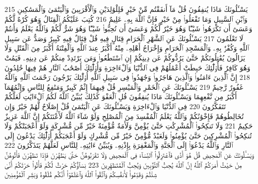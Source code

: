 {\tiny\colorbox{cl_aya}{215}} يَسْـَٔلُونَكَ مَاذَا يُنفِقُونَ قُلْ مَآ أَنفَقْتُم مِّنْ خَيْرٍ فَلِلْوَٰلِدَيْنِ وَٱلْأَقْرَبِينَ وَٱلْيَتَٰمَىٰ وَٱلْمَسَٰكِينِ وَٱبْنِ ٱلسَّبِيلِ وَمَا تَفْعَلُوا۟ مِنْ خَيْرٍ فَإِنَّ ٱللَّهَ بِهِۦ عَلِيمٌ
{\tiny\colorbox{cl_aya}{216}} كُتِبَ عَلَيْكُمُ ٱلْقِتَالُ وَهُوَ كُرْهٌ لَّكُمْ وَعَسَىٰٓ أَن تَكْرَهُوا۟ شَيْـًٔا وَهُوَ خَيْرٌ لَّكُمْ وَعَسَىٰٓ أَن تُحِبُّوا۟ شَيْـًٔا وَهُوَ شَرٌّ لَّكُمْ وَٱللَّهُ يَعْلَمُ وَأَنتُمْ لَا تَعْلَمُونَ
{\tiny\colorbox{cl_aya}{217}} يَسْـَٔلُونَكَ عَنِ ٱلشَّهْرِ ٱلْحَرَامِ قِتَالٍ فِيهِ قُلْ قِتَالٌ فِيهِ كَبِيرٌ وَصَدٌّ عَن سَبِيلِ ٱللَّهِ وَكُفْرٌۢ بِهِۦ وَٱلْمَسْجِدِ ٱلْحَرَامِ وَإِخْرَاجُ أَهْلِهِۦ مِنْهُ أَكْبَرُ عِندَ ٱللَّهِ وَٱلْفِتْنَةُ أَكْبَرُ مِنَ ٱلْقَتْلِ وَلَا يَزَالُونَ يُقَٰتِلُونَكُمْ حَتَّىٰ يَرُدُّوكُمْ عَن دِينِكُمْ إِنِ ٱسْتَطَٰعُوا۟ وَمَن يَرْتَدِدْ مِنكُمْ عَن دِينِهِۦ فَيَمُتْ وَهُوَ كَافِرٌ فَأُو۟لَٰٓئِكَ حَبِطَتْ أَعْمَٰلُهُمْ فِى ٱلدُّنْيَا وَٱلْءَاخِرَةِ وَأُو۟لَٰٓئِكَ أَصْحَٰبُ ٱلنَّارِ هُمْ فِيهَا خَٰلِدُونَ
{\tiny\colorbox{cl_aya}{218}} إِنَّ ٱلَّذِينَ ءَامَنُوا۟ وَٱلَّذِينَ هَاجَرُوا۟ وَجَٰهَدُوا۟ فِى سَبِيلِ ٱللَّهِ أُو۟لَٰٓئِكَ يَرْجُونَ رَحْمَتَ ٱللَّهِ وَٱللَّهُ غَفُورٌ رَّحِيمٌ
{\tiny\colorbox{cl_aya}{219}} يَسْـَٔلُونَكَ عَنِ ٱلْخَمْرِ وَٱلْمَيْسِرِ قُلْ فِيهِمَآ إِثْمٌ كَبِيرٌ وَمَنَٰفِعُ لِلنَّاسِ وَإِثْمُهُمَآ أَكْبَرُ مِن نَّفْعِهِمَا وَيَسْـَٔلُونَكَ مَاذَا يُنفِقُونَ قُلِ ٱلْعَفْوَ كَذَٰلِكَ يُبَيِّنُ ٱللَّهُ لَكُمُ ٱلْءَايَٰتِ لَعَلَّكُمْ تَتَفَكَّرُونَ
{\tiny\colorbox{cl_aya}{220}} فِى ٱلدُّنْيَا وَٱلْءَاخِرَةِ وَيَسْـَٔلُونَكَ عَنِ ٱلْيَتَٰمَىٰ قُلْ إِصْلَاحٌ لَّهُمْ خَيْرٌ وَإِن تُخَالِطُوهُمْ فَإِخْوَٰنُكُمْ وَٱللَّهُ يَعْلَمُ ٱلْمُفْسِدَ مِنَ ٱلْمُصْلِحِ وَلَوْ شَآءَ ٱللَّهُ لَأَعْنَتَكُمْ إِنَّ ٱللَّهَ عَزِيزٌ حَكِيمٌ
{\tiny\colorbox{cl_aya}{221}} وَلَا تَنكِحُوا۟ ٱلْمُشْرِكَٰتِ حَتَّىٰ يُؤْمِنَّ وَلَأَمَةٌ مُّؤْمِنَةٌ خَيْرٌ مِّن مُّشْرِكَةٍ وَلَوْ أَعْجَبَتْكُمْ وَلَا تُنكِحُوا۟ ٱلْمُشْرِكِينَ حَتَّىٰ يُؤْمِنُوا۟ وَلَعَبْدٌ مُّؤْمِنٌ خَيْرٌ مِّن مُّشْرِكٍ وَلَوْ أَعْجَبَكُمْ أُو۟لَٰٓئِكَ يَدْعُونَ إِلَى ٱلنَّارِ وَٱللَّهُ يَدْعُوٓا۟ إِلَى ٱلْجَنَّةِ وَٱلْمَغْفِرَةِ بِإِذْنِهِۦ وَيُبَيِّنُ ءَايَٰتِهِۦ لِلنَّاسِ لَعَلَّهُمْ يَتَذَكَّرُونَ
{\tiny\colorbox{cl_aya}{222}} وَيَسْـَٔلُونَكَ عَنِ ٱلْمَحِيضِ قُلْ هُوَ أَذًى فَٱعْتَزِلُوا۟ ٱلنِّسَآءَ فِى ٱلْمَحِيضِ وَلَا تَقْرَبُوهُنَّ حَتَّىٰ يَطْهُرْنَ فَإِذَا تَطَهَّرْنَ فَأْتُوهُنَّ مِنْ حَيْثُ أَمَرَكُمُ ٱللَّهُ إِنَّ ٱللَّهَ يُحِبُّ ٱلتَّوَّٰبِينَ وَيُحِبُّ ٱلْمُتَطَهِّرِينَ
{\tiny\colorbox{cl_aya}{223}} نِسَآؤُكُمْ حَرْثٌ لَّكُمْ فَأْتُوا۟ حَرْثَكُمْ أَنَّىٰ شِئْتُمْ وَقَدِّمُوا۟ لِأَنفُسِكُمْ وَٱتَّقُوا۟ ٱللَّهَ وَٱعْلَمُوٓا۟ أَنَّكُم مُّلَٰقُوهُ وَبَشِّرِ ٱلْمُؤْمِنِينَ
